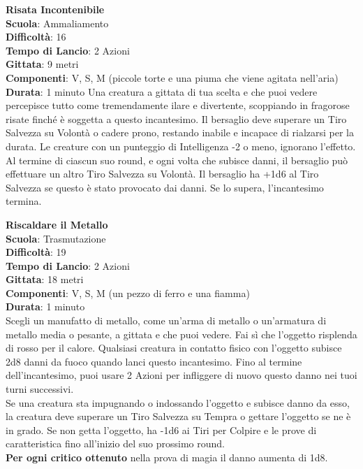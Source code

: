 \begin{multicols}{2}
\medskip\textbf{Risata Incontenibile}\\
\textbf{Scuola}: Ammaliamento\\
\textbf{Difficoltà}: 16\\
\textbf{Tempo di Lancio}: 2 Azioni\\
\textbf{Gittata}: 9 metri\\
\textbf{Componenti}: V, S, M (piccole torte e una piuma che viene agitata nell'aria)\\
\textbf{Durata}: 1 minuto 
Una creatura a gittata di tua scelta e che puoi vedere percepisce tutto come tremendamente ilare e divertente, scoppiando in fragorose risate finché è soggetta a questo incantesimo. Il bersaglio deve superare un Tiro Salvezza su Volontà o cadere prono, restando inabile e incapace di rialzarsi per la durata. Le creature con un punteggio di Intelligenza -2 o meno, ignorano l'effetto.\\
Al termine di ciascun suo round, e ogni volta che subisce danni, il bersaglio può effettuare un altro Tiro Salvezza su Volontà. Il bersaglio ha +1d6 al Tiro Salvezza se questo è stato provocato dai danni. Se lo supera, l'incantesimo termina.

\medskip\textbf{Riscaldare il Metallo}\\
\textbf{Scuola}: Trasmutazione\\
\textbf{Difficoltà}: 19\\
\textbf{Tempo di Lancio}: 2 Azioni\\
\textbf{Gittata}: 18 metri\\
\textbf{Componenti}: V, S, M (un pezzo di ferro e una fiamma)\\
\textbf{Durata}: 1 minuto\\
Scegli un manufatto di metallo, come un'arma di metallo o un'armatura di metallo media o pesante, a gittata e che puoi vedere. Fai sì che l'oggetto risplenda di rosso per il calore. Qualsiasi creatura in contatto fisico con l'oggetto subisce 2d8 danni da fuoco quando lanci questo incantesimo. Fino al termine dell'incantesimo, puoi usare 2 Azioni per infliggere di nuovo questo danno nei tuoi turni successivi.\\
Se una creatura sta impugnando o indossando l'oggetto e subisce danno da esso, la creatura deve superare un Tiro Salvezza su Tempra o gettare l'oggetto se ne è in grado. Se non getta l'oggetto, ha -1d6 ai Tiri per Colpire e le prove di caratteristica fino all'inizio del suo prossimo round.\\
\textbf{Per ogni critico ottenuto} nella prova di magia il danno aumenta di 1d8.


\end{multicols}
